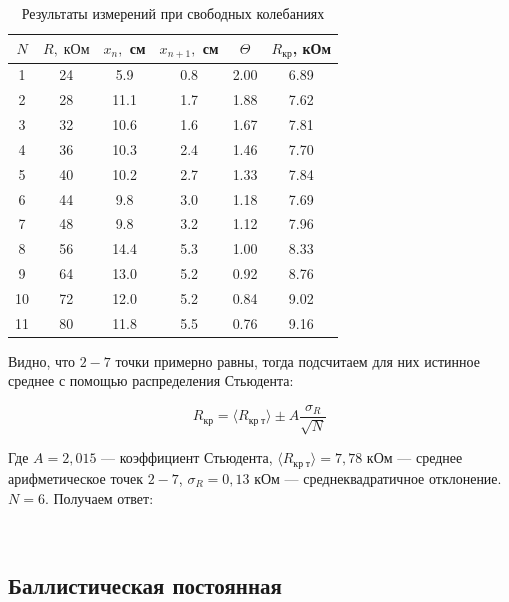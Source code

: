 \documentclass[12pt]{kiarticle} %
\begin{document}
\begin{table}[h]
	\centering
	\caption{Результаты измерений при свободных колебаниях}
	\begin{tabular}{|c|c|c|c|c|c|}
		\hline
		$ N $& $ R, \; кОм $& $ x_n, $ см &$ x_{n+1}, $ см & $ \Theta $ & $ R_{кр} $, кОм\\
		\hline
		1 & 24 & 5.9 & 0.8 & 2.00 & 6.89 \\
		2 & 28 & 11.1 & 1.7 & 1.88 & 7.62 \\
		3 & 32 & 10.6 & 1.6 & 1.67 & 7.81 \\
		4 & 36 & 10.3 & 2.4 & 1.46 & 7.70 \\
		5 & 40 & 10.2 & 2.7 & 1.33 & 7.84 \\
		6 & 44 & 9.8 & 3.0 & 1.18 & 7.69 \\
		7 & 48 & 9.8 & 3.2 & 1.12 & 7.96 \\
		8 & 56 & 14.4 & 5.3 & 1.00 & 8.33 \\
		9 & 64 & 13.0 & 5.2 & 0.92 & 8.76 \\
		10 & 72 & 12.0 & 5.2 & 0.84 & 9.02 \\
		11 & 80 & 11.8 & 5.5 & 0.76 & 9.16 \\
		\hline
	\end{tabular}%
	\label{resR}%
\end{table}%

Видно, что $ 2-7 $ точки примерно равны, тогда подсчитаем для них истинное среднее с помощью распределения Стьюдента: 

\begin{equation}\label{}
R_{кр} = \langle R_{кр \; т}\rangle \pm A \dfrac{\sigma_R}{\sqrt{N}}
\end{equation} 

Где $ A = 2,015 $ --- коэффициент Стьюдента, $   \langle R_{кр \; т}\rangle = 7,78 $ кОм --- среднее арифметическое точек $ 2-7 $, $ \sigma_R  = 0,13 $ кОм --- среднеквадратичное отклонение. $ N = 6 $. Получаем ответ: 

	 \begin{center}
	{} \\
\end{center} 

\subsection{Баллистическая постоянная}
\end{document}
